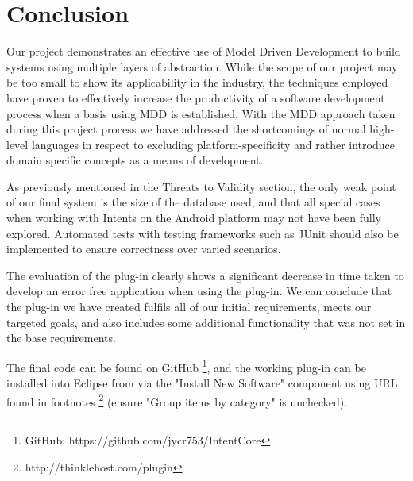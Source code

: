 \section{Conclusion}
\label{conclusion}

Our project demonstrates an effective use of Model Driven Development to build systems using multiple layers of abstraction. While the scope of our project may be too small to show its applicability in the industry, the techniques employed have proven to effectively increase the productivity of a software development process when a basis using MDD is established.
With the MDD approach taken during this project process we have addressed the shortcomings of normal high-level languages in respect to excluding platform-specificity and rather introduce domain specific concepts as a means of development. 

As previously mentioned in the Threats to Validity section, the only weak point of our final system is the size of the database used, and that all special cases when working with Intents on the Android platform may not have been fully explored. Automated tests with testing frameworks such as JUnit should also be implemented to ensure correctness over varied scenarios.

The evaluation of the plug-in clearly shows a significant decrease in time taken to develop an error free application when using the plug-in. We can conclude that the plug-in we have created fulfils all of our initial requirements, meets our targeted goals, and also includes some additional functionality that was not set in the base requirements.

The final code can be found on GitHub \footnote{GitHub: https://github.com/jycr753/IntentCore}, and the working plug-in can be installed into Eclipse from via the "Install New Software" component using URL found in footnotes \footnote{http://thinklehost.com/plugin} (ensure "Group items by category" is unchecked).


